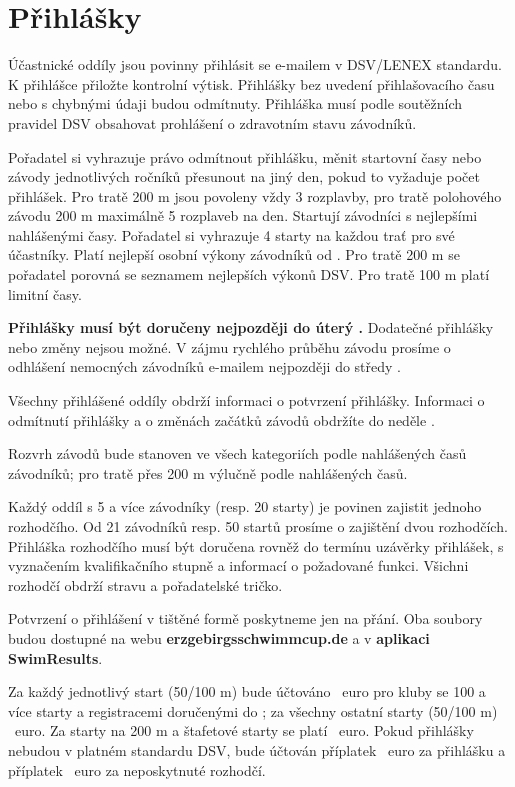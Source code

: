 \section{Přihlášky}

Účastnické oddíly jsou povinny přihlásit se e-mailem v DSV/LENEX standardu. K přihlášce přiložte kontrolní výtisk. Přihlášky bez uvedení přihlašovacího času nebo s chybnými údaji budou odmítnuty. Přihláška musí podle soutěžních pravidel DSV obsahovat prohlášení o zdravotním stavu závodníků.

Pořadatel si vyhrazuje právo odmítnout přihlášku, měnit startovní časy nebo závody jednotlivých ročníků přesunout na jiný den, pokud to vyžaduje počet přihlášek. Pro tratě 200 m jsou povoleny vždy 3 rozplavby, pro tratě polohového závodu 200 m maximálně 5 rozplaveb na den. Startují závodníci s nejlepšími nahlášenými časy. Pořadatel si vyhrazuje 4 starty na každou trať pro své účastníky. Platí nejlepší osobní výkony závodníků od \athleteBestDateCS. Pro tratě 200 m se pořadatel porovná se seznamem nejlepších výkonů DSV. Pro tratě 100 m platí limitní časy.

\textbf{Přihlášky musí být doručeny nejpozději do úterý \registrationDeadlineCS.} Dodatečné přihlášky nebo změny nejsou možné. V zájmu rychlého průběhu závodu prosíme o odhlášení nemocných závodníků e-mailem nejpozději do středy \textbf{\deregistrationDeadlineCS}.

Všechny přihlášené oddíly obdrží informaci o potvrzení přihlášky. Informaci o odmítnutí přihlášky a o změnách začátků závodů obdržíte do neděle \entryConfirmationDateCS.

Rozvrh závodů bude stanoven ve všech kategoriích podle nahlášených časů závodníků; pro tratě přes 200 m výlučně podle nahlášených časů.

Každý oddíl s 5 a více závodníky (resp. 20 starty) je povinen zajistit jednoho rozhodčího. Od 21 závodníků resp. 50 startů prosíme o zajištění dvou rozhodčích. Přihláška rozhodčího musí být doručena rovněž do termínu uzávěrky přihlášek, s vyznačením kvalifikačního stupně a informací o požadované funkci. Všichni rozhodčí obdrží stravu a pořadatelské tričko.

Potvrzení o přihlášení v tištěné formě poskytneme jen na přání. Oba soubory budou dostupné na webu \textbf{erzgebirgsschwimmcup.de} a v \textbf{aplikaci SwimResults}.

Za každý jednotlivý start (50/100 m) bude účtováno \entryEarly\ euro pro kluby se 100 a více starty a registracemi doručenými do \earlyRegistrationDateCS; za všechny ostatní starty (50/100 m) \entrySingle\ euro. Za starty na 200 m a štafetové starty se platí \entryRelay\ euro. Pokud přihlášky nebudou v platném standardu DSV, bude účtován příplatek \entryFormatPunishment\ euro za přihlášku a příplatek \entryRefreePunishment\ euro za neposkytnuté rozhodčí.


